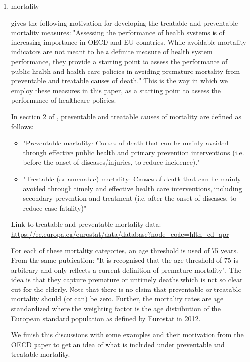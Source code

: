 \documentclass[12pt,english,a4paper]{article}
\begin{document}
\begin{enumerate}
\item mortality
\label{sec:orga5f2f4a}
\label{sec:mortality}

\cite{OECD_avoidable_mortality} gives the following motivation for developing the treatable and preventable mortality measures: "Assessing the performance of health systems is of increasing importance in OECD and EU countries. While avoidable mortality indicators are not meant to be a definite measure of health system performance, they provide a starting point to assess the performance of public health and health care policies in avoiding premature mortality from preventable and treatable causes of death." This is the way in which we employ these measures in this paper, as a starting point to assess the performance of healthcare policies. 

In section 2 of \cite{OECD_avoidable_mortality}, preventable and treatable causes of mortality are defined as follows:
\begin{itemize}
\item "Preventable mortality: Causes of death that can be mainly avoided through effective public health and primary prevention interventions (i.e. before the onset of diseases/injuries, to reduce incidence)."
\item "Treatable (or amenable) mortality: Causes of death that can be mainly avoided through timely and effective health care interventions, including secondary prevention and treatment (i.e. after the onset of diseases, to reduce case-fatality)"
\end{itemize}

Link to treatable and preventable mortality data: \url{https://ec.europa.eu/eurostat/data/database?node\_code=hlth\_cd\_apr}

For each of these mortality categories, an age threshold is used of 75 years. From the same publication: "It is recognised that the age threshold of 75 is arbitrary and only reflects a current definition of premature mortality". The idea is that they capture premature or untimely deaths which is not so clear cut for the elderly. Note that there is no claim that preventable or treatable mortality should (or can) be zero. Further, the mortality rates are age standardized where the weighting factor is the age distribution of the European standard population as defined by Eurostat in 2012.

We finish this discussions with some examples and their motivation from the OECD paper to get an idea of what is included under preventable and treatable mortality.


\end{enumerate}
\end{document}
